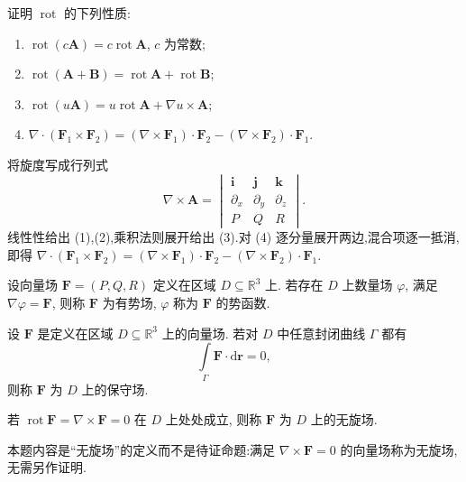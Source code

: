 \begin{example}
    证明 $\operatorname{rot}$ 的下列性质:
    \begin{enumerate}
        \item $\operatorname{rot}(c\bm A)=c\operatorname{rot}\bm A$, $c$ 为常数;
        \item $\operatorname{rot}(\bm A+\bm B)=\operatorname{rot}\bm A+\operatorname{rot}\bm B$;
        \item $\operatorname{rot}(u\bm A)=u\operatorname{rot}\bm A+\nabla u\times\bm A$;
        \item $\nabla\cdot(\bm F_1\times\bm F_2)=(\nabla\times\bm F_1)\cdot\bm F_2-(\nabla\times\bm F_2)\cdot\bm F_1$.
    \end{enumerate}
\end{example}
\exampleblank

\begin{solution}
    将旋度写成行列式
    \[
        \nabla\times\bm A=
        \begin{vmatrix}\bm i      & \bm j      & \bm k      \\
               \partial_x & \partial_y & \partial_z \\P&Q&R\end{vmatrix}.
    \]
    线性性给出 (1),(2),乘积法则展开给出 (3).对 (4) 逐分量展开两边,混合项逐一抵消,即得
    $\nabla\cdot(\bm F_1\times\bm F_2)=(\nabla\times\bm F_1)\cdot\bm F_2-(\nabla\times\bm F_2)\cdot\bm F_1$.
\end{solution}

\begin{definition}
    设向量场 $\bm F=(P,Q,R)$ 定义在区域 $D\subseteq\mathbb{R}^3$ 上. 若存在 $D$ 上数量场 $\varphi$, 满足 $\nabla\varphi=\bm F$, 则称 $\bm F$ 为有势场, $\varphi$ 称为 $\bm F$ 的势函数.
\end{definition}

\begin{definition}
    设 $\bm F$ 是定义在区域 $D\subseteq\mathbb{R}^3$ 上的向量场. 若对 $D$ 中任意封闭曲线 $\Gamma$ 都有
    \[
        \displaystyle\int\limits_\Gamma\bm F\cdot\mathrm{d}\bm r=0,
    \]
    则称 $\bm F$ 为 $D$ 上的保守场.
\end{definition}

\begin{example}
    若 $\operatorname{rot}\bm F=\nabla\times\bm F=0$ 在 $D$ 上处处成立, 则称 $\bm F$ 为 $D$ 上的无旋场.
\end{example}
\exampleblank

\begin{solution}
    本题内容是``无旋场''的定义而不是待证命题:满足 $\nabla\times\bm F=0$ 的向量场称为无旋场,无需另作证明.
\end{solution}

